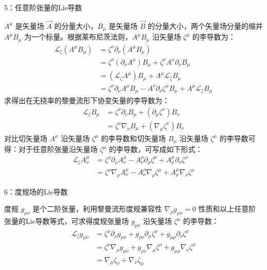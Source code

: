 5：任意阶张量的Lie导数

$A^{\mu}$ 是矢量场 $\overrightarrow{A}$ 的分量大小，$B_{\mu}$ 是矢量场 $\overrightarrow{B}$ 的分量大小，两个矢量场分量的缩并 $A^{\mu}B_{\mu}$ 为一个标量。根据莱布尼茨法则，$A^{\mu}B_{\mu}$ 沿矢量场 $\zeta^{\mu}$ 的李导数为：
$$\begin{aligned}
\mathcal{L}_{\zeta}\left(A^{\mu} B_{\mu}\right) &=\zeta^{\nu} \partial_{\nu}\left(A^{\mu} B_{\mu}\right) \\
&=\zeta^{\nu} (\partial_{\nu} A^{\mu}) B_{\mu}+\zeta^{\nu} A^{\mu} \partial_{\nu} B_{\mu} \\
&=(\mathcal{L}_{\zeta} A^{\mu}) B_{\mu}+A^{\mu} \mathcal{L}_{\zeta} B_{\mu} \\
&=\zeta^{\nu} \partial_{\nu} A^{\mu} B_{\mu}-A^{\nu} \partial_{\nu} \zeta^{\mu} B_{\mu}+A^{\mu} \mathcal{L}_{\zeta} B_{\mu }
\end{aligned}$$
求得出在无挠率的黎曼流形下协变矢量的李导数为：
$$\begin{aligned}
\mathcal{L}_{\zeta} B_{\mu} &=\zeta^{\nu} \partial_{\nu} B_{\mu}+(\partial_{\mu} \zeta^{\nu}) B_{\nu} \\
&=\zeta^{\nu} \nabla_{\nu} B_{\mu}+(\nabla_{\mu} \zeta^{\nu}) B_{\nu}
\end{aligned}$$
对比切矢量场 $A^{\mu}$ 沿矢量场 $\zeta^{\mu}$ 的李导数和切矢量场 $B_{\mu}$ 沿矢量场 $\zeta^{\mu}$ 的李导数可得：对于任意阶张量沿矢量场 $\zeta^{\mu}$ 的李导数，可写成如下形式：
$$\begin{aligned}
\mathcal{L}_{\zeta} A_{\nu}^{\mu} &=\zeta^{\rho} \partial_{\rho} A_{\nu}^{\mu}-A_{\nu}^{\rho} \partial_{\rho} \zeta^{\mu}+A_{\rho}^{\mu} \partial_{\nu} \zeta^{\rho} \\
&=\zeta^{\rho} \nabla_{\rho} A_{\nu}^{\mu}-A_{\nu}^{\rho} \nabla_{\rho} \zeta^{\mu}+A_{\rho}^{\mu} \nabla_{\nu} \zeta^{\rho}
\end{aligned}$$

6：度规场的Lie导数

度规 $g_{\mu \nu}$ 是个二阶张量，利用黎曼流形度规兼容性 $\nabla_{\rho} g_{\mu \nu}=0$ 性质和以上任意阶张量的Lie导数等式，可求得度规张量场 $g_{\mu \nu}$ 沿矢量场 $\zeta^{\mu}$ 的李导数：
$$\begin{aligned}
\mathcal{L}_{\zeta} g_{\mu \nu} 
&=\zeta^{\rho} \partial_{\rho} g_{\mu \nu}+g_{\rho \nu} \partial_{\mu} \zeta^{\rho}+g_{\mu \rho} \partial_{\nu} \zeta^{\rho} \\
&=\zeta^{\rho} \nabla_{\rho} g_{\mu \nu}+g_{\rho \nu} \nabla_{\mu} \zeta^{\rho}+g_{\mu \rho} \nabla_{\nu} \zeta^{\rho} \\
&=\nabla_{\mu} \zeta_{\nu}+\nabla_{\nu} \zeta_{\mu} 
\end{aligned}$$

